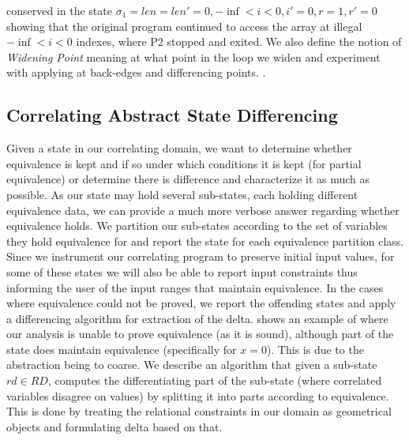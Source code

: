 conserved in the state $\sigma_1 = {len = len' =0, -\inf < i < 0, i' = 0, r = 1, r' = 0}$ showing that the original program continued to access the array at illegal $-\inf < i < 0$ indexes, where P2 stopped and exited. We also define the notion of \emph{Widening Point} meaning at what point in the loop we widen and experiment with applying at back-edges and differencing points. .

\subsection{Correlating Abstract State Differencing} 
Given a state in our correlating domain, we want to determine whether equivalence is kept and if so under which conditions it is kept (for partial equivalence) or determine there is difference and characterize it as much as possible. As our state may hold several sub-states, each holding different equivalence data, we can provide a much more verbose answer regarding whether equivalence holds. We partition our sub-states according to the set of variables they hold equivalence for and report the state for each equivalence partition class. Since we instrument our correlating program to preserve initial input values, for some of these states we will also be able to report input constraints thus informing the user of the input ranges that maintain equivalence. In the cases where equivalence could not be proved, we report the offending states and apply a differencing algorithm for extraction of the delta.  shows an example of where our analysis is unable to prove equivalence (as it is sound), although part of the state does maintain equivalence (specifically for $x=0$). This is due to the abstraction being to coarse. We describe an algorithm that given a sub-state $rd \in RD$, computes the differentiating part of the sub-state (where correlated variables disagree on values) by splitting it into parts according to equivalence. This is done by treating the relational constraints in our domain as geometrical objects and formulating delta based on that.

